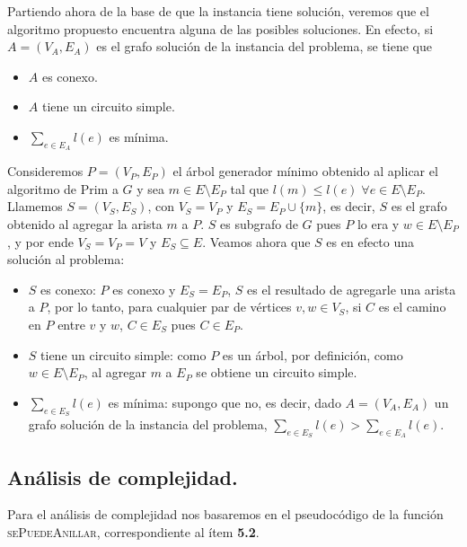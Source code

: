 Partiendo ahora de la base de que la instancia tiene solución, veremos
que el algoritmo propuesto encuentra alguna de las posibles soluciones. En
efecto, si $A = (V_A, E_A)$ es el grafo solución de la instancia del
problema, se tiene que

\begin{itemize}
  \item $A$ es conexo.

  \item $A$ tiene un circuito simple.

  \item $\sum\limits_{e \in E_A} l(e)$ es mínima.
\end{itemize}

Consideremos $P = (V_P, E_P)$ el árbol generador mínimo obtenido al aplicar
el algoritmo de Prim a $G$ y sea $m \in E \setminus E_P$ tal que $l(m) \leq
l(e) \; \forall e \in E \setminus E_P$. Llamemos $S = (V_S, E_S)$, con $V_S
= V_P$ y $E_S = E_P \cup \{m\}$, es decir, $S$ es el grafo obtenido al
agregar la arista $m$ a $P$. $S$ es subgrafo de $G$ pues $P$ lo era y $w \in
E \setminus E_P$, y por ende $V_S = V_P = V$ y $E_S \subseteq E$. Veamos
ahora que $S$ es en efecto una solución al problema:

\begin{itemize}
  \item $S$ es conexo: $P$ es conexo y $E_S = E_P$, $S$ es el resultado de
  agregarle una arista a $P$, por lo tanto, para cualquier par de vértices
  $v, w \in V_S$, si $C$ es el camino en $P$ entre $v$ y $w$, $C \in E_S$
  pues $C \in E_P$.
  \item $S$ tiene un circuito simple: como $P$ es un árbol, por definición,
  como $w \in E \setminus E_P$, al agregar $m$ a $E_P$ se obtiene un
  circuito simple.
  \item $\sum\limits_{e \in E_S} l(e)$ es mínima: supongo que no, es decir,
  dado $A = (V_A, E_A)$ un grafo solución de la instancia del problema,
  $\sum\limits_{e \in E_S} l(e) > \sum\limits_{e \in E_A} l(e)$.
\end{itemize}


\newpage
\subsection{Análisis de complejidad.}

\vspace*{0.3cm}

Para el análisis de complejidad nos basaremos en el pseudocódigo de la función
\textsc{sePuedeAnillar}, correspondiente al ítem \textbf{5.2}.

